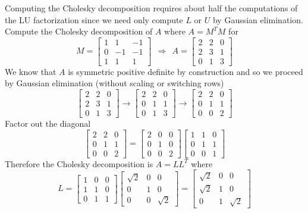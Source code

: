 \begin{example}
Computing the Cholesky decomposition requires about half the computations of the LU factorization since we need only compute $L$ or $U$ by Gaussian elimination. Compute the Cholesky decomposition of $A$ where $A = M^TM$ for
$$
M =
\left[ \begin{array}{rrr} 1 & 1 & -1 \\ 0 & -1 & -1 \\ 1 & 1 & 1 \end{array} \right]
\ \ \Rightarrow \ \
A =
\left[ \begin{array}{rrr} 2 & 2 & 0 \\ 2 & 3 & 1 \\ 0 & 1 & 3 \end{array} \right]
$$
We know that $A$ is symmetric positive definite by construction and so we proceed by Gaussian elimination (without scaling or switching rows)
$$
\left[ \begin{array}{rrr} 2 & 2 & 0 \\ 2 & 3 & 1 \\ 0 & 1 & 3 \end{array} \right]
\rightarrow
\left[ \begin{array}{rrr} 2 & 2 & 0 \\ 0 & 1 & 1 \\ 0 & 1 & 3 \end{array} \right]
\rightarrow
\left[ \begin{array}{ccc} 2 & 2 & 0 \\ 0 & 1 & 1 \\ 0 & 0 & 2 \end{array} \right]
$$
Factor out the diagonal
$$
\left[ \begin{array}{ccc} 2 & 2 & 0 \\ 0 & 1 & 1 \\ 0 & 0 & 2 \end{array} \right]
=
\left[ \begin{array}{ccc} 2 & 0 & 0 \\ 0 & 1 & 0 \\ 0 & 0 & 2 \end{array} \right]
\left[ \begin{array}{ccc} 1 & 1 & 0 \\ 0 & 1 & 1 \\ 0 & 0 & 1 \end{array} \right]
$$
Therefore the Cholesky decomposition is $A = LL^T$ where
$$
L = 
\left[ \begin{array}{ccc} 1 & 0 & 0 \\ 1 & 1 & 0 \\ 0 & 1 & 1 \end{array} \right]
\left[ \begin{array}{ccc} \sqrt{2} & 0 & 0 \\ 0 & 1 & 0 \\ 0 & 0 & \sqrt{2} \end{array} \right]
=
\left[ \begin{array}{ccc} \sqrt{2} & 0 & 0 \\ \sqrt{2} & 1 & 0 \\ 0 & 1 & \sqrt{2} \end{array} \right]
$$
\end{example}